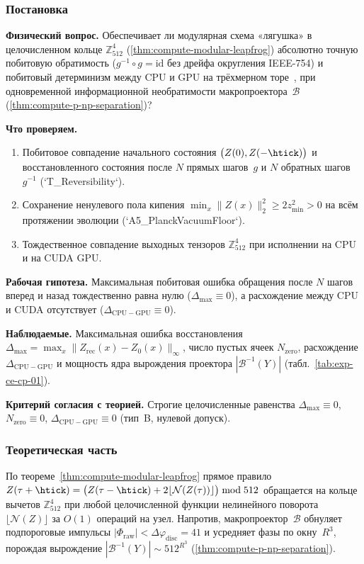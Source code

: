 \label{exp:cecp01}

\subsubsection*{Постановка}
\textbf{Физический вопрос.}
Обеспечивает ли модулярная схема «лягушка» в целочисленном кольце $\mathbb{Z}_{512}^4$ (\cref{thm:compute-modular-leapfrog}) абсолютно точную побитовую обратимость ($g^{-1}\circ g = \mathrm{id}$ без дрейфа округления IEEE-754) и побитовый детерминизм между CPU и GPU на трёхмерном торе~\latGCKshort, при одновременной информационной необратимости макропроектора~$\mathcal{B}$ (\cref{thm:compute-p-np-separation})?

\textbf{Что проверяем.}
\begin{enumerate}[label=\textbf{(\alph*)},leftmargin=*,itemsep=0.25em]
\item Побитовое совпадение начального состояния $\bigl(Z(0), Z(-\htick)\bigr)$ и восстановленного состояния после $N$ прямых шагов~$g$ и $N$ обратных шагов~$g^{-1}$ (`T\_Reversibility`).
\item Сохранение ненулевого пола кипения $\min_x \|Z(x)\|_2^2 \ge 2 z_{\min}^2 > 0$ на всём протяжении эволюции (`A5\_PlanckVacuumFloor`).
\item Тождественное совпадение выходных тензоров $\mathbb{Z}_{512}^4$ при исполнении на CPU и на CUDA GPU.
\end{enumerate}

\textbf{Рабочая гипотеза.}
Максимальная побитовая ошибка обращения после $N$ шагов вперед и назад тождественно равна нулю ($\Delta_{\max} \equiv 0$), а расхождение между CPU и CUDA отсутствует ($\Delta_{\mathrm{CPU-GPU}} \equiv 0$).

\textbf{Наблюдаемые.}
Максимальная ошибка восстановления $\Delta_{\max} = \max_x \|Z_{\mathrm{rec}}(x) - Z_0(x)\|_\infty$, число пустых ячеек $N_{\mathrm{zero}}$, расхождение $\Delta_{\mathrm{CPU-GPU}}$ и мощность ядра вырождения проектора $|\mathcal{B}^{-1}(Y)|$ (табл.~\ref{tab:exp-ce-cp-01}).

\textbf{Критерий согласия с теорией.}
Строгие целочисленные равенства $\Delta_{\max} \equiv 0$, $N_{\mathrm{zero}} \equiv 0$, $\Delta_{\mathrm{CPU-GPU}} \equiv 0$ (тип~B, нулевой допуск).

\subsubsection*{Теоретическая часть}
По теореме~\ref{thm:compute-modular-leapfrog} прямое правило $Z(\tau+\htick) = \bigl(Z(\tau-\htick) + 2\lfloor\mathcal{N}(Z(\tau))\rfloor\bigr)\bmod 512$ обращается на кольце вычетов $\mathbb{Z}_{512}^4$ при любой целочисленной функции нелинейного поворота $\lfloor\mathcal{N}(Z)\rfloor$ за $O(1)$ операций на узел.
Напротив, макропроектор~$\mathcal{B}$ обнуляет подпороговые импульсы $|\Phi_{\mathrm{raw}}| < \Delta\varphi_{\mathrm{disc}} = 41$ и усредняет фазы по окну~$R^3$, порождая вырождение $|\mathcal{B}^{-1}(Y)| \sim 512^{R^3}$ (\cref{thm:compute-p-np-separation}).

